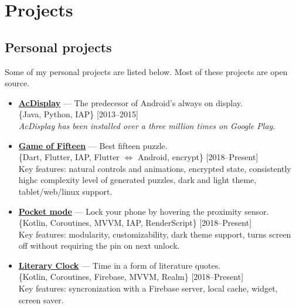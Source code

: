 \documentclass[a4paper]{article}
\begin{document}
	\section*{Projects}
	\subsection*{Personal projects}
	Some of my personal projects are listed below. Most of these projects are open source.
	\begin{itemize}
		\item \faAndroid \enskip \href{http://artemchep.com/acdisplay/}{\textbf{AcDisplay}} --- The predecesor of Android's always on display. \\[0.2em]
		{\footnotesize \{Java, Python, IAP\} \hfill [2013--2015]} \\[0.2em]
		\textit{AcDisplay has been installed over a three million times on Google Play.} 

		\item \faAndroid \enskip \faChrome \enskip \faLinux \enskip \href{https://github.com/AChep/15puzzle}{\textbf{Game of Fifteen}} --- Best fifteen puzzle. \\[0.2em]
		{\footnotesize \{Dart, Flutter, IAP, Flutter $\Leftrightarrow$ Android, encrypt\} \hfill [2018--Present]} \\[0.2em]
		Key features: natural controls and animations, encrypted state, consistently highc complexity level of generated puzzles, dark and light theme, tablet/web/linux support. 
		
		\item \faAndroid \enskip \href{https://github.com/AChep/PocketMode}{\textbf{Pocket mode}} --- Lock your phone by hovering the proximity sensor. \\[0.2em]
		{\footnotesize \{Kotlin, Coroutines, MVVM, IAP, RenderScript\} \hfill [2018--Present]} \\[0.2em]
		Key features: modularity, customizability, dark theme support, turns screen off without requiring the pin on next unlock.   
		
		\item \faAndroid \enskip \href{https://github.com/AChep/literaryclock}{\textbf{Literary Clock}} --- Time in a form of literature quotes. \\[0.2em]
		{\footnotesize \{Kotlin, Coroutines, Firebase, MVVM, Realm\} \hfill [2018--Present]} \\[0.2em]
		Key features: syncronization with a Firebase server, local cache, widget, screen saver.  
			

\end{itemize}
\end{document}

